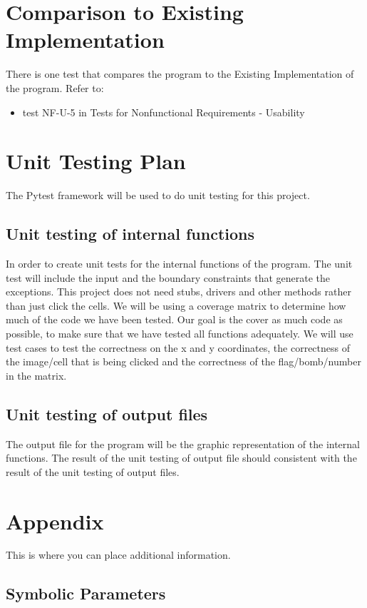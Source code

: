 \documentclass[12pt, titlepage]{article}
\begin{document}
\section{Comparison to Existing Implementation}	
There is one test that compares the program to the Existing Implementation of the program.
Refer to:
\begin{itemize}
    \item test NF-U-5 in Tests for Nonfunctional Requirements - Usability
\end{itemize}

\section{Unit Testing Plan}
The Pytest framework will be used to do unit testing for this project.
\subsection{Unit testing of internal functions}
In order to create unit tests for the internal functions of the program. The unit test will include the input and the boundary constraints that generate the exceptions. This project does not need stubs, drivers and other methods rather than just click the cells. We will be using a coverage matrix to determine how much of the code we have been tested. Our goal is the cover as much code as possible, to make sure that we have tested all functions adequately. We will use test cases to test the correctness on the x and y coordinates, the correctness of the image/cell that is being clicked and the correctness of the flag/bomb/number in the matrix. 
\subsection{Unit testing of output files}		
The output file for the program will be the graphic representation of the internal functions. The result of the unit testing of output file should consistent with the result of the unit testing of output files.

\section{Appendix}

This is where you can place additional information.

\subsection{Symbolic Parameters}
\end{document}

